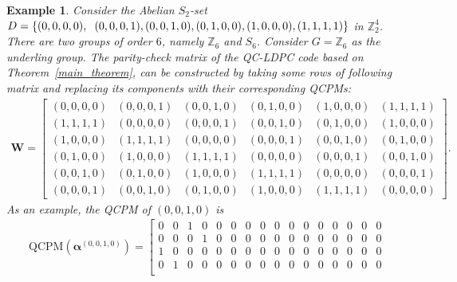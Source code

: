 \documentclass[journal,draftclsnofoot,onecolumn,12pt,twoside]{IEEEtran}
\newtheorem{Example}{Example}
\begin{document}
\begin{Example}
Consider the Abelian  $S_2$-set $D=\left\lbrace (0, 0, 0, 0), \right. \\ \left. (0, 0, 0, 1), (0, 0, 1, 0), (0, 1, 0, 0),(1, 0, 0, 0), (1, 1, 1, 1) \right\rbrace$ in  $\mathbb{Z}_2^4$. There are two groups of order $6$, namely $\mathbb{Z}_6$ and $S_6$. Consider $G=\mathbb{Z}_6$ as the underling group. The parity-check matrix of the QC-LDPC code  based on Theorem~\ref{main_theorem}, can be constructed  by taking some rows of following matrix and replacing its components with their corresponding QCPMs:
\begin{eqnarray*}
\mathbf{W}=
\left[ \begin{array}{cccccc}
(0, 0, 0, 0) & (0, 0, 0, 1) & (0, 0, 1, 0) & (0, 1, 0, 0) & (1, 0, 0, 0) & (1, 1, 1, 1) \\
 (1, 1, 1, 1) & (0, 0, 0, 0) & (0, 0, 0, 1) & (0, 0, 1, 0) & (0, 1, 0, 0) & (1, 0, 0, 0) \\
  (1, 0, 0, 0) & (1, 1, 1, 1) & (0, 0, 0, 0) & (0, 0, 0, 1) & (0, 0, 1, 0) & (0, 1, 0, 0)\\
  (0, 1, 0, 0) & (1, 0, 0, 0) & (1, 1, 1, 1) & (0, 0, 0, 0) & (0, 0, 0, 1) & (0, 0, 1, 0) \\
 (0, 0, 1, 0) & (0, 1, 0, 0) & (1, 0, 0, 0) & (1, 1, 1, 1) & (0, 0, 0, 0) & (0, 0, 0, 1)  \\
 (0, 0, 0, 1) &  (0, 0, 1, 0) & (0, 1, 0, 0) & (1, 0, 0, 0) & (1, 1, 1, 1) & (0, 0, 0, 0)
\end{array}\right].
\end{eqnarray*}
As an example, the QCPM of $(0, 0, 1, 0)$ is
\begin{eqnarray*}
\mathrm{QCPM}(\boldsymbol{\alpha}^{(0, 0, 1, 0)})
=\left[ \begin{array}{cccccccccccccccc}
     0   &  0  &   1   &  0  &   0 &    0   &  0   &  0   &  0  &   0  &   0   &  0  &   0 &    0  &   0  &   0\\
     0 &    0 &    0    & 1&     0  &   0&     0 &    0 &    0   &  0  &   0 &    0 &    0 &    0  &   0   &  0\\
     1  &   0    & 0  &   0   &  0  &   0  &   0 &    0    & 0    & 0  &   0 &    0&     0  &   0   &  0 &    0\\
     0   & 1  &   0  &   0    & 0   &  0&     0 &    0  &   0 &    0   &  0   &  0  &   0   &  0   &  0  &   0\\

\end{array}
\end{eqnarray*}
\end{Example}
\end{document}
